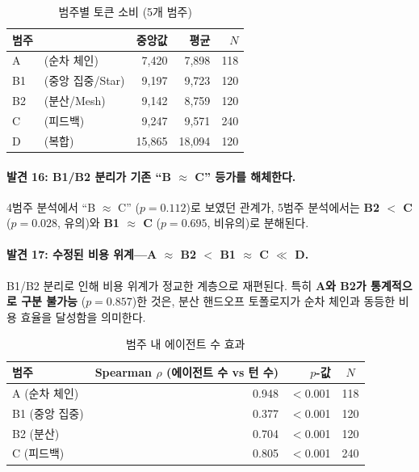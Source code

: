 \begin{table}[H]
\centering
\caption{범주별 토큰 소비 (5개 범주)}
\label{tab:cat-token-summary}
{\small
\begin{tabular}{llrrr}
\toprule
범주 & & 중앙값 & 평균 & $N$ \\
\midrule
A  & (순차 체인)    & 7,420  & 7,898  & 118 \\
B1 & (중앙 집중/Star) & 9,197  & 9,723  & 120 \\
B2 & (분산/Mesh)     & 9,142  & 8,759  & 120 \\
C  & (피드백)        & 9,247  & 9,571  & 240 \\
D  & (복합)          & 15,865 & 18,094 & 120 \\
\bottomrule
\end{tabular}
}
\end{table}

\paragraph{발견 16: B1/B2 분리가 기존 ``B $\approx$ C'' 등가를 해체한다.}
4범주 분석에서 ``B $\approx$ C'' ($p=0.112$)로 보였던 관계가, 5범주 분석에서는 \textbf{B2 $<$ C} ($p=0.028$, 유의)와 \textbf{B1 $\approx$ C} ($p=0.695$, 비유의)로 분해된다.

\paragraph{발견 17: 수정된 비용 위계---A $\approx$ B2 $<$ B1 $\approx$ C $\ll$ D.}
B1/B2 분리로 인해 비용 위계가 정교한 계층으로 재편된다. 특히 \textbf{A와 B2가 통계적으로 구분 불가능} ($p=0.857$)한 것은, 분산 핸드오프 토폴로지가 순차 체인과 동등한 비용 효율을 달성함을 의미한다.

\begin{table}[H]
\centering
\caption{범주 내 에이전트 수 효과}
\label{tab:spearman-agents}
{\small
\begin{tabular}{lrrc}
\toprule
범주 & Spearman $\rho$ (에이전트 수 vs 턴 수) & $p$-값 & $N$ \\
\midrule
A (순차 체인)  & 0.948 & $<$0.001 & 118 \\
B1 (중앙 집중) & 0.377 & $<$0.001 & 120 \\
B2 (분산)      & 0.704 & $<$0.001 & 120 \\
C (피드백)     & 0.805 & $<$0.001 & 240 \\
\bottomrule
\end{tabular}
}
\end{table}

